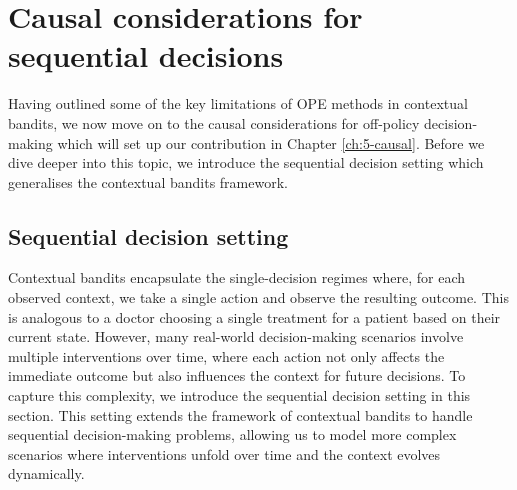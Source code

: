 \section{Causal considerations for sequential decisions}
Having outlined some of the key limitations of OPE methods in contextual bandits, we now move on to the causal considerations for off-policy decision-making which will set up our contribution in Chapter \ref*{ch:5-causal}. 
Before we dive deeper into this topic, we introduce the sequential decision setting which generalises the contextual bandits framework.

\subsection{Sequential decision setting}
Contextual bandits encapsulate the single-decision regimes where, for each observed context, we take a single action and observe the resulting outcome. This is analogous to a doctor choosing a single treatment for a patient based on their current state. However, many real-world decision-making scenarios involve multiple interventions over time, where each action not only affects the immediate outcome but also influences the context for future decisions. To capture this complexity, we introduce the sequential decision setting in this section. This setting extends the framework of contextual bandits to handle sequential decision-making problems, allowing us to model more complex scenarios where interventions unfold over time and the context evolves dynamically.

